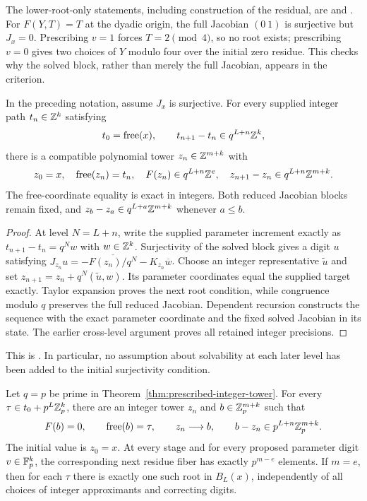 The lower-root-only statements, including construction of the residual,
are 
and .
For $F(Y,T)=T$ at the dyadic origin, the full Jacobian $(0\ 1)$ is
surjective but $J_x=0$. Prescribing $v=1$ forces $T=2\pmod4$, so no root
exists; prescribing $v=0$ gives two choices of $Y$ modulo four over the
initial zero residue. This checks why the solved block, rather than merely
the full Jacobian, appears in the criterion.

\begin{theorem}
\label{thm:prescribed-integer-tower}
In the preceding notation, assume $J_x$ is surjective. For every supplied
integer path $t_n\in\mathbb Z^k$ satisfying
\[
 t_0=\operatorname{free}(x),\qquad
 t_{n+1}-t_n\in q^{L+n}\mathbb Z^k,
\]
there is a compatible polynomial tower $z_n\in\mathbb Z^{m+k}$ with
\[
 z_0=x,\quad \operatorname{free}(z_n)=t_n,\quad
 F(z_n)\in q^{L+n}\mathbb Z^e,\quad
 z_{n+1}-z_n\in q^{L+n}\mathbb Z^{m+k}.
\]
The free-coordinate equality is exact in integers. Both reduced Jacobian
blocks remain fixed, and $z_b-z_a\in q^{L+a}\mathbb Z^{m+k}$ whenever $a\le b$.
\end{theorem}

\begin{proof}
At level $N=L+n$, write the supplied parameter increment exactly as
$t_{n+1}-t_n=q^Nw$ with $w\in\mathbb Z^k$. Surjectivity of the solved block
gives a digit $u$ satisfying
$J_{z_n}u=-\overline{F(z_n)/q^N}-K_{z_n}\overline w$.
Choose an integer representative $\widetilde u$ and set
$z_{n+1}=z_n+q^N(\widetilde u,w)$. Its parameter coordinates equal the
supplied target exactly. Taylor expansion proves the next root condition,
while congruence modulo $q$ preserves the full reduced Jacobian.
Dependent recursion constructs the sequence with the exact parameter
coordinate and the fixed solved Jacobian in its state. The earlier
cross-level argument proves all retained integer precisions.
\end{proof}

This is
.
In particular, no assumption about solvability at each later level has been
added to the initial surjectivity condition.

\begin{theorem}
\label{thm:prescribed-padic-tower}
Let $q=p$ be prime in Theorem~\ref{thm:prescribed-integer-tower}.
For every $\tau\in t_0+p^L\mathbb Z_p^k$, there are an integer tower $z_n$ and
$b\in\mathbb Z_p^{m+k}$ such that
\[
 F(b)=0,\qquad\operatorname{free}(b)=\tau,\qquad
 z_n\longrightarrow b,\qquad b-z_n\in p^{L+n}\mathbb Z_p^{m+k}.
\]
The initial value is $z_0=x$. At every stage and for every proposed
parameter digit $v\in\mathbb F_p^k$, the corresponding next residue fiber has
exactly $p^{m-e}$ elements. If $m=e$, then for each $\tau$ there is exactly
one such root in $B_L(x)$, independently of all choices of integer
approximants and correcting digits.
\end{theorem}

